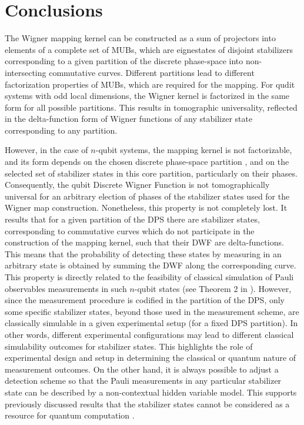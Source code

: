 \documentclass{article}
\begin{document}
\section{Conclusions}

The Wigner mapping kernel can be constructed as a sum of projectors into
elements of a complete set of MUBs, which are eignestates of disjoint
stabilizers corresponding to a given partition of the discrete phase-space
into non-intersecting commutative curves. Different partitions lead to
different factorization properties of MUBs, which are required for the
mapping. For qudit systems with odd local dimensions, the Wigner kernel is
factorized in the same form for all possible partitions. This results in
tomographic universality, reflected in the delta-function form of Wigner
functions of any stabilizer state corresponding to any partition.

However, in the case of $n$-qubit systems, the mapping kernel is not
factorizable, and its form depends on the chosen discrete phase-space
partition \cite{Bjork2007}, and on the selected set of stabilizer states in
this core partition, particularly on their phases. Consequently, the qubit
Discrete Wigner Function is not tomographically universal for an arbitrary
election of phases of the stabilizer states used for the Wigner map
construction. Nonetheless, this property is not completely lost. It results
that for a given partition of the DPS there are stabilizer states,
corresponding to commutative curves which do not participate in the
construction of the mapping kernel, such that their DWF are delta-functions.
This means that the probability of detecting these states by measuring in an
arbitrary state is obtained by summing the DWF along the corresponding curve.
This property is directly related to the feasibility of classical simulation of
Pauli observables measurements in such $n$-qubit states (see Theorem 2 in
\cite{Raus17}). However, since the measurement procedure is codified in the
partition of the DPS, only some specific stabilizer states, beyond those used
in the measurement scheme, are classically simulable in a given experimental
setup (for a fixed DPS partition). In other words, different experimental
configurations may lead to different classical simulability outcomes for
stabilizer states. This highlights the role of experimental design and setup in
determining the classical or quantum nature of measurement outcomes. On the
other hand, it is always possible to adjust a detection scheme so that the
Pauli measurements in any particular stabilizer state can be described by a
non-contextual hidden variable model. This supports previously discussed
results \cite{Raus17,contextMagic} that the stabilizer states cannot be
considered as a resource for quantum computation \cite{gottKnill}.
\end{document}
